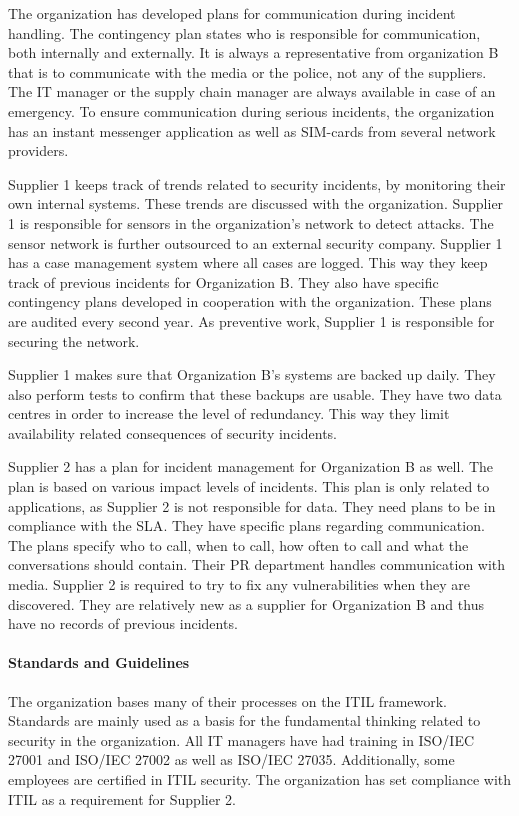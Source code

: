 \documentclass[b5paper, twoside, openright, 11pt]{report}
\begin{document}
The organization has developed plans for communication during incident handling. The contingency plan states who is responsible for communication, both internally and externally. It is always a representative from organization B that is to communicate with the media or the police, not any of the suppliers. The IT manager or the supply chain manager are always available in case of an emergency. To ensure communication during serious incidents, the organization has an instant messenger application as well as SIM-cards from several network providers. 

Supplier 1 keeps track of trends related to security incidents, by monitoring their own internal systems. These trends are discussed with the organization. Supplier 1 is responsible for sensors in the organization's network to detect attacks. The sensor network is further outsourced to an external security company. Supplier 1 has a case management system where all cases are logged. This way they keep track of previous incidents for Organization B. They also have specific contingency plans developed in cooperation with the organization. These plans are audited every second year. As preventive work, Supplier 1 is responsible for securing the network.

Supplier 1 makes sure that Organization B's systems are backed up daily. They also perform tests to confirm that these backups are usable. They have two data centres in order to increase the level of redundancy. This way they limit availability related consequences of security incidents.

Supplier 2 has a plan for incident management for Organization B as well. The plan is based on various impact levels of incidents. This plan is only related to applications, as Supplier 2 is not responsible for data. They need plans to be in compliance with the \ac{SLA}. They have specific plans regarding communication. The plans specify who to call, when to call, how often to call and what the conversations should contain. Their PR department handles communication with media. Supplier 2 is required to try to fix any vulnerabilities when they are discovered. They are relatively new as a supplier for Organization B and thus have no records of previous incidents.

\paragraph{Standards and Guidelines}
The organization bases many of their processes on the ITIL framework. Standards are mainly used as a basis for the fundamental thinking related to security in the organization. All IT managers have had training in ISO/IEC 27001 and ISO/IEC 27002 as well as ISO/IEC 27035. Additionally, some employees are certified in ITIL security. The organization has set compliance with \ac{ITIL} as a requirement for Supplier 2. %
\end{document}
